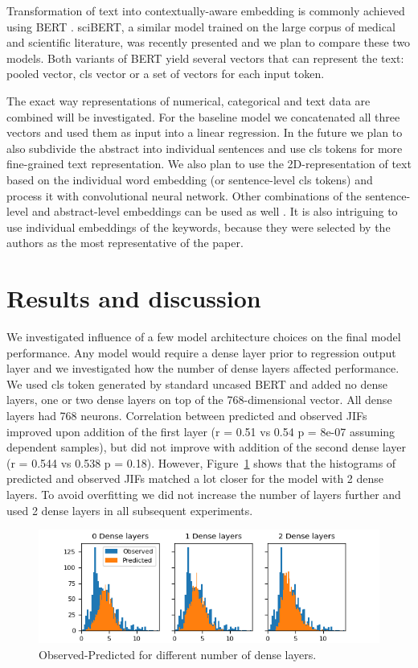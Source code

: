 \documentclass[11pt]{article}
\begin{document}
Transformation of text into contextually-aware embedding is commonly achieved using BERT \citep{DBLP:journals/corr/abs-1810-04805}. sciBERT, a similar model trained on the large corpus of medical and scientific literature, was recently presented \citep{DBLP:journals/corr/abs-1903-10676} and we plan to compare these two models. Both variants of BERT yield several vectors that can represent the text: pooled vector, cls vector or a set of vectors for each input token. 

The exact way representations of numerical, categorical and text data are combined will be investigated. For the baseline model we concatenated all three vectors and used them as input into a linear regression. In the future we plan to also subdivide the abstract into individual sentences and use cls tokens for more fine-grained text representation. We also plan to use the 2D-representation of text based on the individual word embedding (or sentence-level cls tokens) and process it with convolutional  neural network. Other combinations of the sentence-level and abstract-level embeddings can be used as well \citep{hs2022}. It is also intriguing to use individual embeddings of the keywords, because they were selected by the authors as the most representative of the paper.

\section{Results and discussion}
We investigated influence of a few model architecture choices on the final model performance. Any model would require a dense layer prior to regression output layer and we investigated how the number of dense layers affected performance. We used cls token generated by standard uncased BERT and added no dense layers, one or two dense layers on top of the 768-dimensional vector. All dense layers had 768 neurons. Correlation between predicted and observed JIFs improved upon addition of the first layer (r = 0.51 vs 0.54 p = 8e-07 assuming dependent samples), but did not improve with addition of the second dense layer (r = 0.544 vs 0.538 p = 0.18). However,  Figure~\ref{fig:dense} shows that the histograms of predicted and observed JIFs matched a lot closer for the model with 2 dense layers. To avoid overfitting we did not increase the number of layers further and used 2 dense layers in all subsequent experiments.

\begin{figure}
	\includegraphics[width= \columnwidth]{./Images/Dense layers.png}
	\caption{Observed-Predicted for different number of dense layers.}
	\label{fig:dense}
\end{figure}
\end{document}
